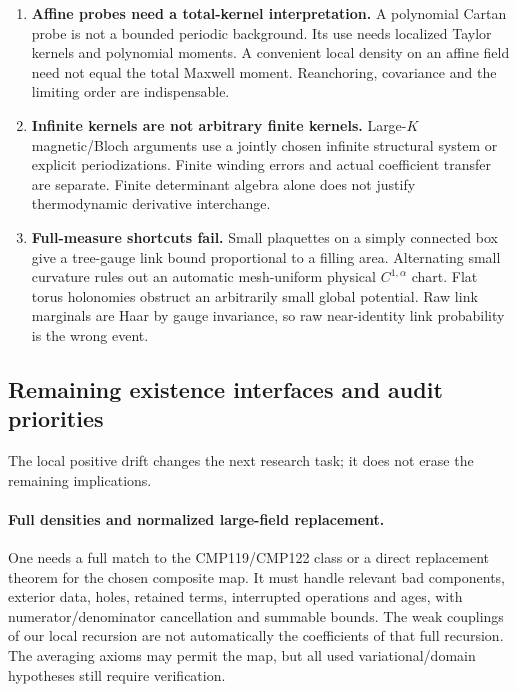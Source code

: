 \documentclass[11pt]{article}
\theoremstyle{remark}
\begin{document}
\begin{enumerate}
\item \textbf{Affine probes need a
total-kernel interpretation.}
A polynomial Cartan probe is not
a bounded periodic background.
Its use needs localized Taylor
kernels and polynomial moments.
A convenient local density on an
affine field need not equal the
total Maxwell moment. Reanchoring,
covariance and the limiting order
are indispensable.

\item \textbf{Infinite kernels are
not arbitrary finite kernels.}
Large-\(K\) magnetic/Bloch arguments
use a jointly chosen infinite
structural system or explicit
periodizations. Finite winding
errors and actual coefficient
transfer are separate.
Finite determinant algebra alone
does not justify thermodynamic
derivative interchange.

\item \textbf{Full-measure shortcuts
fail.}
Small plaquettes on a simply
connected box give a tree-gauge
link bound proportional to a
filling area. Alternating small
curvature rules out an automatic
mesh-uniform physical
\(C^{1,\alpha}\) chart.
Flat torus holonomies obstruct
an arbitrarily small global
potential. Raw link marginals
are Haar by gauge invariance,
so raw near-identity link
probability is the wrong event.
\end{enumerate}

\subsection{Remaining existence interfaces and audit priorities}
\label{hrb-remaining}

The local positive drift changes the
next research task; it does not
erase the remaining implications.

\paragraph{Full densities and
normalized large-field replacement.}
One needs a full match to the
CMP119/CMP122 class or a direct
replacement theorem for the chosen
composite map. It must handle
relevant bad components, exterior
data, holes, retained terms,
interrupted operations and ages,
with numerator/denominator
cancellation and summable bounds.
The weak couplings of our local
recursion are not automatically
the coefficients of that full
recursion. The averaging axioms
may permit the map, but all used
variational/domain hypotheses
still require verification.
\end{document}
